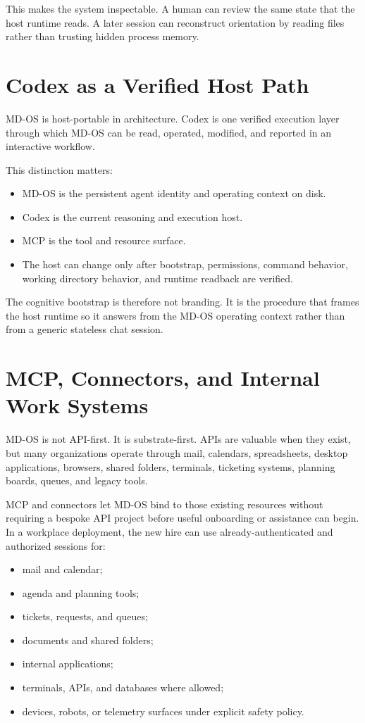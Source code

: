 \documentclass[11pt,a4paper]{article}
\begin{document}
This makes the system inspectable. A human can review the same state that the
host runtime reads. A later session can reconstruct orientation by reading
files rather than trusting hidden process memory.

\section{Codex as a Verified Host Path}

MD-OS is host-portable in architecture. Codex is one verified execution layer
through which MD-OS can be read, operated, modified, and reported in an
interactive workflow.

This distinction matters:

\begin{itemize}
  \item MD-OS is the persistent agent identity and operating context on disk.
  \item Codex is the current reasoning and execution host.
  \item MCP is the tool and resource surface.
  \item The host can change only after bootstrap, permissions, command
  behavior, working directory behavior, and runtime readback are verified.
\end{itemize}

The cognitive bootstrap is therefore not branding. It is the procedure that
frames the host runtime so it answers from the MD-OS operating context rather
than from a generic stateless chat session.

\section{MCP, Connectors, and Internal Work Systems}

MD-OS is not API-first. It is substrate-first. APIs are valuable when they
exist, but many organizations operate through mail, calendars, spreadsheets,
desktop applications, browsers, shared folders, terminals, ticketing systems,
planning boards, queues, and legacy tools.

MCP and connectors let MD-OS bind to those existing resources without requiring
a bespoke API project before useful onboarding or assistance can begin. In a
workplace deployment, the new hire can use already-authenticated and
authorized sessions for:

\begin{itemize}
  \item mail and calendar;
  \item agenda and planning tools;
  \item tickets, requests, and queues;
  \item documents and shared folders;
  \item internal applications;
  \item terminals, APIs, and databases where allowed;
  \item devices, robots, or telemetry surfaces under explicit safety policy.
\end{itemize}
\end{document}

